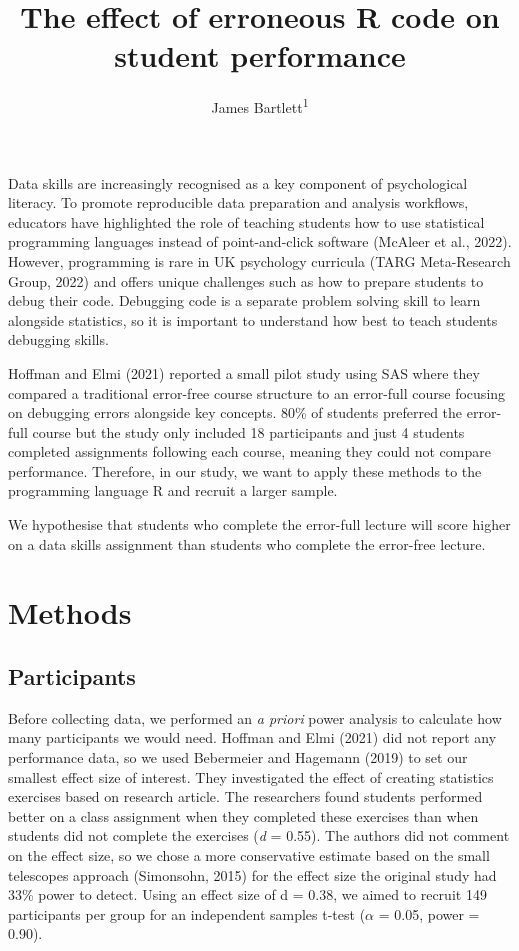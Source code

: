 \documentclass[
  man,floatsintext]{apa6}
\title{The effect of erroneous R code on student performance}
\author{James Bartlett\textsuperscript{1}}
\date{}
\affiliation{\vspace{0.5cm}\textsuperscript{1} University of Glasgow, United Kingdom}
\begin{document}
\maketitle

Data skills are increasingly recognised as a key component of psychological literacy. To promote reproducible data preparation and analysis workflows, educators have highlighted the role of teaching students how to use statistical programming languages instead of point-and-click software (McAleer et al., 2022). However, programming is rare in UK psychology curricula (TARG Meta-Research Group, 2022) and offers unique challenges such as how to prepare students to debug their code. Debugging code is a separate problem solving skill to learn alongside statistics, so it is important to understand how best to teach students debugging skills.

Hoffman and Elmi (2021) reported a small pilot study using SAS where they compared a traditional error-free course structure to an error-full course focusing on debugging errors alongside key concepts. 80\% of students preferred the error-full course but the study only included 18 participants and just 4 students completed assignments following each course, meaning they could not compare performance. Therefore, in our study, we want to apply these methods to the programming language R and recruit a larger sample.

We hypothesise that students who complete the error-full lecture will score higher on a data skills assignment than students who complete the error-free lecture.

\hypertarget{methods}{%
\section{Methods}\label{methods}}

\hypertarget{participants}{%
\subsection{Participants}\label{participants}}

Before collecting data, we performed an \emph{a priori} power analysis to calculate how many participants we would need. Hoffman and Elmi (2021) did not report any performance data, so we used Bebermeier and Hagemann (2019) to set our smallest effect size of interest. They investigated the effect of creating statistics exercises based on research article. The researchers found students performed better on a class assignment when they completed these exercises than when students did not complete the exercises (\emph{d} = 0.55). The authors did not comment on the effect size, so we chose a more conservative estimate based on the small telescopes approach (Simonsohn, 2015) for the effect size the original study had 33\% power to detect. Using an effect size of d = 0.38, we aimed to recruit 149 participants per group for an independent samples t-test (\(\alpha\) = 0.05, power = 0.90).
\end{document}
